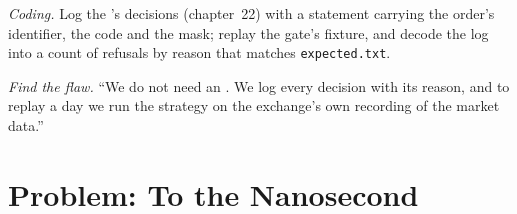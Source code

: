 \begin{exercise}[$\star\star\star$]\label{exo:ll:logging-capture-and-replay:7}
\emph{Coding.} Log the 's decisions (chapter~22) with a statement carrying the order's identifier, the code and the
mask; replay the gate's fixture, and decode the log into a count of refusals by reason that matches \texttt{expected.txt}.
\end{exercise}

\begin{exercise}[$\star\star\star$]\label{exo:ll:logging-capture-and-replay:8}
\emph{Find the flaw.} ``We do not need an . We log every decision with its reason, and to replay a day we run the
strategy on the exchange's own recording of the market data.''
\end{exercise}

\section{Problem: To the Nanosecond}

